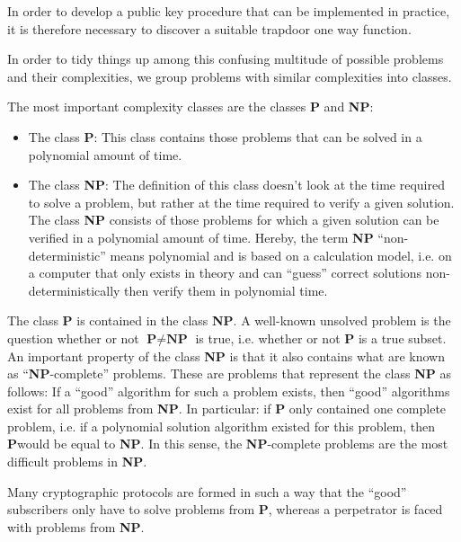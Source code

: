 In order to develop a public key procedure that can be implemented in practice, 
it is therefore necessary to discover a suitable trapdoor one way function.\par

In order to tidy things up among this confusing multitude of possible problems 
and their complexities, we group problems with similar complexities into 
classes.

The most important complexity classes are the classes \textbf{P} and 
\textbf{NP}: 

\begin{itemize}

    \item The class \textbf{P}: This class contains those problems that can be 
solved in a polynomial amount of time.
    
		\item The class \textbf{NP}: The definition of this class doesn't look at
		the time required to solve a problem, but rather at the time required to
		verify a given solution. The class \textbf{NP} consists of those problems
		for which a given solution can be verified in a polynomial amount of time.
		Hereby, the term \textbf{NP} ``non-deterministic'' means polynomial and is
		based on a calculation model, i.e. on a computer that only exists in theory
		and can ``guess'' correct solutions non-deterministically then verify them
		in polynomial time.

\end{itemize}

The class \textbf{P} is contained in the class \textbf{NP}. A well-known 
unsolved problem is the question whether or not $ \textbf{P} \neq \textbf{NP} $ 
is true, i.e. whether or not \textbf{P} is a true subset. An important property 
of the class \textbf{NP} is that it also contains what are known as ``\textbf{NP}-complete''
problems. These are problems that represent the 
class \textbf{NP} as follows: If a ``good'' algorithm for such a 
problem exists, then ``good'' algorithms exist for all problems from 
\textbf{NP}. In particular: if \textbf{P} only contained one complete problem, 
i.e. if a polynomial solution algorithm existed for this problem, then 
\textbf{P}would be equal to \textbf{NP}. In this sense, the \textbf{NP}-complete 
problems are the most difficult problems in \textbf{NP}.

Many cryptographic protocols are formed in such a way that the ``good''
subscribers only have to solve problems from \textbf{P}, whereas a 
perpetrator is faced with problems from \textbf{NP}.

